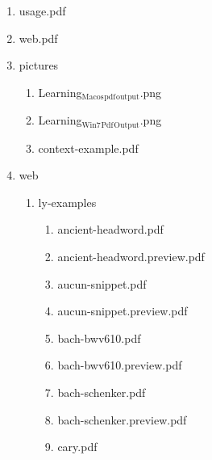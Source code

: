 \documentclass[11pt]{article}
\begin{document}
\begin{enumerate}
\begin{enumerate}
\begin{enumerate}
\begin{enumerate}
\begin{enumerate}
\begin{enumerate}
\begin{enumerate}
\begin{enumerate}
\item usage.pdf
\label{sec-1-1-1-1-46-10-3-1-1-1-1-1-1-27}

\item web.pdf
\label{sec-1-1-1-1-46-10-3-1-1-1-1-1-1-28}

\item pictures
\label{sec-1-1-1-1-46-10-3-1-1-1-1-1-1-29}
\begin{enumerate}
\item Learning$_{\text{Macos}}$$_{\text{pdf}}$$_{\text{output}}$.png
\label{sec-1-1-1-1-46-10-3-1-1-1-1-1-1-29-1}

\item Learning$_{\text{Win7}}$$_{\text{Pdf}}$$_{\text{Output}}$.png
\label{sec-1-1-1-1-46-10-3-1-1-1-1-1-1-29-2}

\item context-example.pdf
\label{sec-1-1-1-1-46-10-3-1-1-1-1-1-1-29-3}
\end{enumerate}

\item web
\label{sec-1-1-1-1-46-10-3-1-1-1-1-1-1-30}
\begin{enumerate}
\item ly-examples
\label{sec-1-1-1-1-46-10-3-1-1-1-1-1-1-30-1}
\begin{enumerate}
\item ancient-headword.pdf
\label{sec-1-1-1-1-46-10-3-1-1-1-1-1-1-30-1-1}

\item ancient-headword.preview.pdf
\label{sec-1-1-1-1-46-10-3-1-1-1-1-1-1-30-1-2}

\item aucun-snippet.pdf
\label{sec-1-1-1-1-46-10-3-1-1-1-1-1-1-30-1-3}

\item aucun-snippet.preview.pdf
\label{sec-1-1-1-1-46-10-3-1-1-1-1-1-1-30-1-4}

\item bach-bwv610.pdf
\label{sec-1-1-1-1-46-10-3-1-1-1-1-1-1-30-1-5}

\item bach-bwv610.preview.pdf
\label{sec-1-1-1-1-46-10-3-1-1-1-1-1-1-30-1-6}

\item bach-schenker.pdf
\label{sec-1-1-1-1-46-10-3-1-1-1-1-1-1-30-1-7}

\item bach-schenker.preview.pdf
\label{sec-1-1-1-1-46-10-3-1-1-1-1-1-1-30-1-8}

\item cary.pdf
\label{sec-1-1-1-1-46-10-3-1-1-1-1-1-1-30-1-9}


\end{enumerate}
\end{enumerate}
\end{enumerate}
\end{enumerate}
\end{enumerate}
\end{enumerate}
\end{enumerate}
\end{enumerate}
\end{enumerate}
\end{enumerate}
\end{document}

